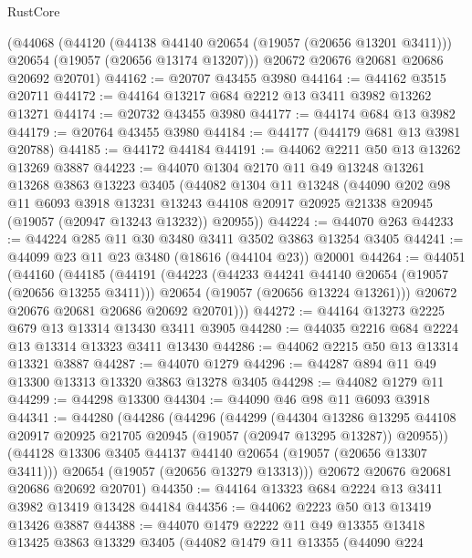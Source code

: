 \begin{lexlean}{RustCore}
\begin{coremodule}
    (@44068
      (@44120
        (@44138 @44140 @20654 (@19057 (@20656 @13201 @3411)))
        @20654
        (@19057 (@20656 @13174 @13207)))
      @20672
      @20676
      @20681
      @20686
      @20692
      @20701)
@44162 := @20707 @43455 @3980
@44164 := @44162 @3515 @20711
@44172 := @44164 @13217 @684 @2212 @13 @3411 @3982 @13262 @13271
@44174 := @20732 @43455 @3980
@44177 := @44174 @684 @13 @3982
@44179 := @20764 @43455 @3980
@44184 := @44177 (@44179 @681 @13 @3981 @20788)
@44185 := @44172 @44184
@44191 := @44062 @2211 @50 @13 @13262 @13269 @3887
@44223 := @44070
    @1304
    @2170
    @11
    @49
    @13248
    @13261
    @13268
    @3863
    @13223
    @3405
    (@44082
      @1304
      @11
      @13248
      (@44090
        @202
        @98
        @11
        @6093
        @3918
        @13231
        @13243
        @44108
        @20917
        @20925
        @21338
        @20945
        (@19057 (@20947 @13243 @13232))
        @20955))
@44224 := @44070 @263
@44233 := @44224 @285 @11 @30 @3480 @3411 @3502 @3863 @13254 @3405
@44241 := @44099 @23 @11 @23 @3480 (@18616 (@44104 @23)) @20001
@44264 := @44051
    (@44160
      (@44185
        (@44191
          (@44223
            (@44233 @44241 @44140 @20654 (@19057 (@20656 @13255 @3411)))
            @20654
            (@19057 (@20656 @13224 @13261)))
          @20672
          @20676
          @20681
          @20686
          @20692
          @20701)))
@44272 := @44164 @13273 @2225 @679 @13 @13314 @13430 @3411 @3905
@44280 := @44035 @2216 @684 @2224 @13 @13314 @13323 @3411 @13430
@44286 := @44062 @2215 @50 @13 @13314 @13321 @3887
@44287 := @44070 @1279
@44296 := @44287 @894 @11 @49 @13300 @13313 @13320 @3863 @13278 @3405
@44298 := @44082 @1279 @11
@44299 := @44298 @13300
@44304 := @44090 @46 @98 @11 @6093 @3918
@44341 := @44280
    (@44286
      (@44296
        (@44299
          (@44304
            @13286
            @13295
            @44108
            @20917
            @20925
            @21705
            @20945
            (@19057 (@20947 @13295 @13287))
            @20955))
        (@44128 @13306 @3405 @44137 @44140 @20654 (@19057 (@20656 @13307 @3411)))
        @20654
        (@19057 (@20656 @13279 @13313)))
      @20672
      @20676
      @20681
      @20686
      @20692
      @20701)
@44350 := @44164 @13323 @684 @2224 @13 @3411 @3982 @13419 @13428 @44184
@44356 := @44062 @2223 @50 @13 @13419 @13426 @3887
@44388 := @44070
    @1479
    @2222
    @11
    @49
    @13355
    @13418
    @13425
    @3863
    @13329
    @3405
    (@44082
      @1479
      @11
      @13355
      (@44090
        @224

\end{coremodule}
\end{lexlean}
